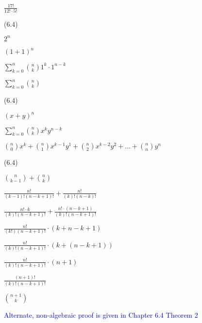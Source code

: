 \documentclass{exam}
\begin{document}
\begin{questions}
\begin{center}
\(\frac{17!}{12! \cdot 5!}\) 

\end{center}

 (6.4)

\begin{center}

\(2^n\)

\((1+1)^n\)

\(\sum_{k=0}^n {n \choose k} 1^k \cdot 1^{n-k}\)

\(\sum_{k=0}^n {n \choose k}\)

\end{center}

 (6.4)

\begin{center}
\( (x + y)^n \)

\(\sum_{k=0}^n {n \choose k} x^{k} y^{n-k}\)

\( {n \choose 0} x^k + {n \choose 1} x^{k-1}y^1 + {n \choose 2} x^{k-2}y^2 + ... + {n \choose n} y^n \)
\end{center}

 (6.4)

\begin{center}

\( { n \choose k-1 } + { n \choose k } \)

\( \frac{n!}{(k-1)!(n-k+1)!} + \frac{n!}{(k)!(n-k)!} \)

\( \frac{n! \cdot k}{(k)!(n-k+1)!} + \frac{n! \cdot (n-k+1) }{(k)!(n-k+1)!} \)

\( \frac{n!}{(k!)(n-k+1)!} \cdot (k + n-k+1) \)

\( \frac{n!}{(k)!(n-k+1)!} \cdot (k + (n - k + 1)) \)

\( \frac{n!}{(k)!(n-k+1)!} \cdot (n + 1) \)

\( \frac{(n+1)!}{(k)!(n-k+1)!} \)

\( {n+1 \choose k} \)

\textcolor{blue}{Alternate, non-algebraic proof is given in Chapter 6.4 Theorem 2}

\end{center}




\end{questions}
\end{document}
